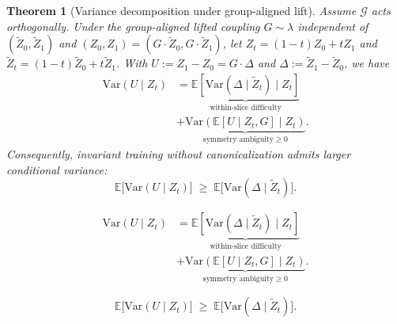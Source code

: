 \documentclass[10pt,a4paper]{amsart}
\newtheorem{theorem}{Theorem}
\begin{document}
\begin{theorem}[Variance decomposition under group-aligned lift]
\label{thm:canon-var-decomp}
Assume $\mathcal{G}$ acts orthogonally. Under the group-aligned lifted coupling
$G\sim\lambda$ independent of $(\widetilde Z_0,\widetilde Z_1)$ and $(Z_0,Z_1)=(G\cdot\widetilde Z_0,G\cdot\widetilde Z_1)$,
let $Z_t=(1-t)Z_0+tZ_1$ and $\widetilde Z_t=(1-t)\widetilde Z_0+t\widetilde Z_1$.
With $U:=Z_1-Z_0=G\cdot\Delta$ and $\Delta:=\widetilde Z_1-\widetilde Z_0$, we have
\begin{equation}\label{eq:canon-var-decomp}
\begin{aligned}
\mathrm{Var}(U\mid Z_t)&=
\underbrace{\mathbb{E}\!\left[\mathrm{Var}(\Delta\mid \widetilde Z_t)\mid Z_t\right]}_{\text{within-slice difficulty}}\\
&+\underbrace{\mathrm{Var}\!\left(\mathbb{E}[U\mid Z_t,G]\mid Z_t\right)}_{\text{symmetry ambiguity}\ge 0}.
\end{aligned}
\end{equation}
Consequently, invariant training without canonicalization admits larger conditional variance:
\begin{equation}\label{eq:canon-var-ineq}
\mathbb{E}\big[\mathrm{Var}(U\mid Z_t)\big]\;\ge\;\mathbb{E}\big[\mathrm{Var}(\Delta\mid \widetilde Z_t)\big].
\end{equation}
\end{theorem}

\begin{equation}
\begin{aligned}
\mathrm{Var}(U\mid Z_t)&=
\underbrace{\mathbb{E}\!\left[\mathrm{Var}(\Delta\mid \widetilde Z_t)\mid Z_t\right]}_{\text{within-slice difficulty}}\\
&+\underbrace{\mathrm{Var}\!\left(\mathbb{E}[U\mid Z_t,G]\mid Z_t\right)}_{\text{symmetry ambiguity}\ge 0}.
\end{aligned}
\end{equation}

\begin{equation}
\mathbb{E}\big[\mathrm{Var}(U\mid Z_t)\big]\;\ge\;\mathbb{E}\big[\mathrm{Var}(\Delta\mid \widetilde Z_t)\big].
\end{equation}
\end{document}
